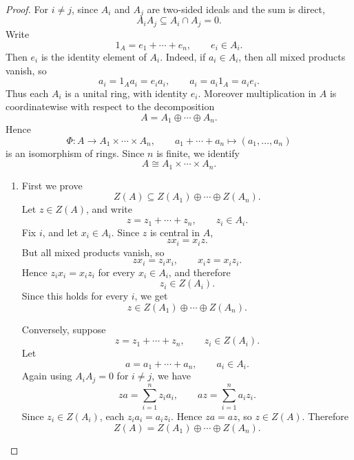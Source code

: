 \begin{proof}
    For \(i\neq j\), since \(A_i\) and \(A_j\) are two-sided ideals and the sum is direct,
    \[
        A_iA_j\subseteq A_i\cap A_j=0.
    \]
    Write
    \[
        1_A=e_1+\cdots+e_n,\qquad e_i\in A_i.
    \]
    Then \(e_i\) is the identity element of \(A_i\). Indeed, if \(a_i\in A_i\), then
    all mixed products vanish, so
    \[
        a_i=1_Aa_i=e_i a_i,\qquad
        a_i=a_i1_A=a_i e_i.
    \]
    Thus each \(A_i\) is a unital ring, with identity \(e_i\). Moreover multiplication in
    \(A\) is coordinatewise with respect to the decomposition
    \[
        A=A_1\oplus\cdots\oplus A_n.
    \]
    Hence
    \[
        \Phi\colon A\longrightarrow A_1\times\cdots\times A_n,
        \qquad
        a_1+\cdots+a_n\longmapsto (a_1,\dots,a_n)
    \]
    is an isomorphism of rings. Since \(n\) is finite, we identify
    \[
        A \cong A_1\times\cdots\times A_n.
    \]

    \begin{enumerate}
        \renewcommand{\labelenumi}{(\roman{enumi})}

        \item First we prove
              \[
                  Z(A)\subseteq Z(A_1)\oplus\cdots\oplus Z(A_n).
              \]
              Let \(z\in Z(A)\), and write
              \[
                  z=z_1+\cdots+z_n,\qquad z_i\in A_i.
              \]
              Fix \(i\), and let \(x_i\in A_i\). Since \(z\) is central in \(A\),
              \[
                  zx_i=x_i z.
              \]
              But all mixed products vanish, so
              \[
                  zx_i=z_i x_i,\qquad x_i z=x_i z_i.
              \]
              Hence \(z_i x_i=x_i z_i\) for every \(x_i\in A_i\), and therefore
              \[
                  z_i\in Z(A_i).
              \]
              Since this holds for every \(i\), we get
              \[
                  z\in Z(A_1)\oplus\cdots\oplus Z(A_n).
              \]

              Conversely, suppose
              \[
                  z=z_1+\cdots+z_n,\qquad z_i\in Z(A_i).
              \]
              Let
              \[
                  a=a_1+\cdots+a_n,\qquad a_i\in A_i.
              \]
              Again using \(A_iA_j=0\) for \(i\neq j\), we have
              \[
                  za=\sum_{i=1}^n z_i a_i,
                  \qquad
                  az=\sum_{i=1}^n a_i z_i.
              \]
              Since \(z_i\in Z(A_i)\), each \(z_i a_i=a_i z_i\). Hence \(za=az\), so
              \(z\in Z(A)\). Therefore
              \[
                  Z(A)=Z(A_1)\oplus\cdots\oplus Z(A_n).
              \]


\end{enumerate}
\end{proof}
